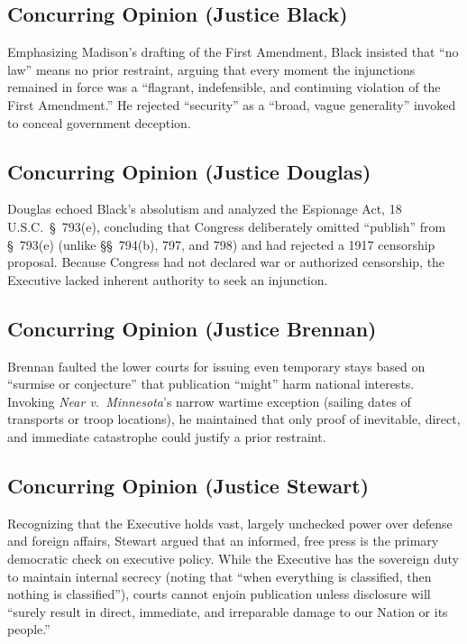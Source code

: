 \documentclass[12pt]{article}
\begin{document}
\subsection{Concurring Opinion (Justice Black)}

Emphasizing Madison's drafting of the First Amendment, Black insisted that ``no law'' means no prior restraint, arguing that every moment the injunctions remained in force was a ``flagrant, indefensible, and continuing violation of the First Amendment.'' He rejected ``security'' as a ``broad, vague generality'' invoked to conceal government deception.

\subsection{Concurring Opinion (Justice Douglas)}

Douglas echoed Black's absolutism and analyzed the Espionage Act, 18 U.S.C.\ \S~793(e), concluding that Congress deliberately omitted ``publish'' from \S~793(e) (unlike \S\S~794(b), 797, and 798) and had rejected a 1917 censorship proposal. Because Congress had not declared war or authorized censorship, the Executive lacked inherent authority to seek an injunction.

\subsection{Concurring Opinion (Justice Brennan)}

Brennan faulted the lower courts for issuing even temporary stays based on ``surmise or conjecture'' that publication ``might'' harm national interests. Invoking \textit{Near v.\ Minnesota}'s narrow wartime exception (sailing dates of transports or troop locations), he maintained that only proof of inevitable, direct, and immediate catastrophe could justify a prior restraint.

\subsection{Concurring Opinion (Justice Stewart)}

Recognizing that the Executive holds vast, largely unchecked power over defense and foreign affairs, Stewart argued that an informed, free press is the primary democratic check on executive policy. While the Executive has the sovereign duty to maintain internal secrecy (noting that ``when everything is classified, then nothing is classified''), courts cannot enjoin publication unless disclosure will ``surely result in direct, immediate, and irreparable damage to our Nation or its people.''
\end{document}
